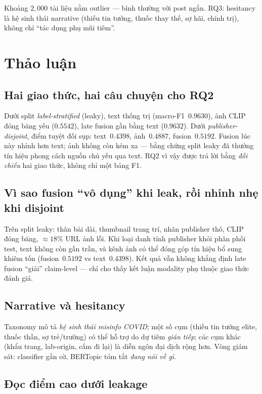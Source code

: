 \documentclass[12pt, a4paper]{report}
\begin{document}
Khoảng $2{,}000$ tài liệu nằm outlier --- bình thường với post ngắn.
RQ3: hesitancy là hệ sinh thái narrative (thiếu tin tưởng, thuốc thay thế, sợ hãi, chính trị), không chỉ ``tác dụng phụ mũi tiêm''.

\section{Thảo luận}
\label{sec:discussion}

\subsection{Hai giao thức, hai câu chuyện cho RQ2}

Dưới split \emph{label-stratified} (leaky), text thống trị (macro-F1~$0.9630$), ảnh CLIP đóng băng yếu ($0.5542$), late fusion gần bằng text ($0.9632$).
Dưới \emph{publisher-disjoint}, điểm tuyệt đối sụp: text~$0.4398$, ảnh~$0.4887$, fusion~$0.5192$.
Fusion lúc này nhỉnh hơn text; ảnh không còn kém xa --- bằng chứng split leaky đã thưởng tín hiệu phong cách nguồn chủ yếu qua text.
RQ2 vì vậy được trả lời bằng \emph{đối chiếu} hai giao thức, không chỉ một bảng F1.

\subsection{Vì sao fusion ``vô dụng'' khi leak, rồi nhỉnh nhẹ khi disjoint}

Trên split leaky: thân bài dài, thumbnail trang trí, nhãn publisher thô, CLIP đóng băng, $\approx 18\%$ URL ảnh lỗi.
Khi loại danh tính publisher khỏi phân phối test, text không còn gần trần, và kênh ảnh có thể đóng góp tín hiệu bổ sung khiêm tốn (fusion~$0.5192$ vs text~$0.4398$).
Kết quả vẫn không khẳng định late fusion ``giải'' claim-level --- chỉ cho thấy kết luận modality phụ thuộc giao thức đánh giá.

\subsection{Narrative và hesitancy}

Taxonomy mô tả \emph{hệ sinh thái misinfo COVID}; một số cụm (thiếu tin tưởng elite, thuốc thần, sợ trẻ/trường) có thể hỗ trợ do dự tiêm \emph{gián tiếp}; các cụm khác (khẩu trang, lab-origin, cấm đi lại) là diễn ngôn đại dịch rộng hơn.
Vòng giám sát: classifier gắn cờ, BERTopic tóm tắt \emph{đang nói về gì}.

\subsection{Đọc điểm cao dưới leakage}
\end{document}
